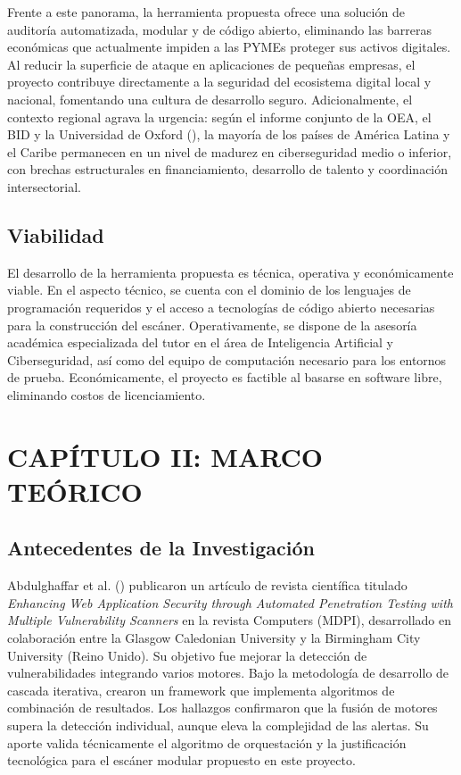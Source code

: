 \documentclass[12pt, a4paper]{article}
\begin{document}
Frente a este panorama, la herramienta propuesta ofrece una solución de auditoría
automatizada, modular y de código abierto, eliminando las barreras económicas que
actualmente impiden a las PYMEs proteger sus activos digitales. Al reducir la
superficie de ataque en aplicaciones de pequeñas empresas, el proyecto contribuye
directamente a la seguridad del ecosistema digital local y nacional, fomentando
una cultura de desarrollo seguro. Adicionalmente, el contexto regional agrava la
urgencia: según el informe conjunto de la OEA, el BID y la Universidad de Oxford
(\cite{oasidb2025}), la mayoría de los países de América Latina y el Caribe
permanecen en un nivel de madurez en ciberseguridad medio o inferior, con brechas
estructurales en financiamiento, desarrollo de talento y coordinación
intersectorial.

\subsection{Viabilidad}

El desarrollo de la herramienta propuesta es técnica, operativa y económicamente
viable. En el aspecto técnico, se cuenta con el dominio de los lenguajes de
programación requeridos y el acceso a tecnologías de código abierto necesarias
para la construcción del escáner. Operativamente, se dispone de la asesoría
académica especializada del tutor en el área de Inteligencia Artificial y
Ciberseguridad, así como del equipo de computación necesario para los entornos
de prueba. Económicamente, el proyecto es factible al basarse en software libre,
eliminando costos de licenciamiento.

\newpage
\section{CAPÍTULO II: MARCO TEÓRICO}

\subsection{Antecedentes de la Investigación}

Abdulghaffar et al. (\citeyear*{abdulghaffar2023}) publicaron un artículo de
revista científica titulado \textit{Enhancing Web Application Security through
Automated Penetration Testing with Multiple Vulnerability Scanners} en la
revista Computers (MDPI), desarrollado en colaboración entre la Glasgow
Caledonian University y la Birmingham City University (Reino Unido). Su objetivo
fue mejorar la detección de vulnerabilidades integrando varios motores. Bajo la
metodología de desarrollo de cascada iterativa, crearon un framework que
implementa algoritmos de combinación de resultados. Los hallazgos confirmaron
que la fusión de motores supera la detección individual, aunque eleva la
complejidad de las alertas. Su aporte valida técnicamente el algoritmo de
orquestación y la justificación tecnológica para el escáner modular propuesto
en este proyecto.
\end{document}
